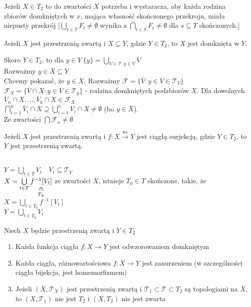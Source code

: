 \begin{uw} 
    Jeżeli $X \in T_2$ to do zwartości $X$ potrzeba i wystaracza, aby każda rodzina
    zbiorów domkniętych w $x$, mająca własność skończonego przekroju, miała niepusty 
    przekrój $[ \bigcup\limits_{t \in T} F_t \neq \emptyset$ wynika z $\bigcap\limits_{t
    \in S} F_t \neq \emptyset$ dla $ s \subseteq T$ skończonych.]
\end{uw} 
\begin{tw} 
    Jeżeli $X$ jest przestrzenią zwartą i $X \subseteq Y$, gdzie $Y \in T_2$, to 
    $X$ jest domknięta w $Y$.
\end{tw} 
\begin{dd} 
    Skoro $Y \in T_2$, to dla $y \in Y \ \{y\} = \bigcup\limits_{V \in \mathcal T,y \in V} \overline V$ \\ 
    Rozważmy $y \in \overline X \subseteq Y$ \\ 
    Chcemy pokazać, że $y \in X$. Rozważmy $\mathcal F = \{ \overline V: y \in V \in \mathcal T_Y\}$ \\ 
    $\mathcal F_X = \{ \overline V \cap X : y \in V \in \mathcal T_y\}$ - rodzina domkniętych podzbiorów $X$.
    Dla dowolnych $\overline V_n \cap X, \ldots, \overline V_k \cap X \in \mathcal F_X$ \\ 
    $\bigcap\limits_{i=1}^n \overline V_i \cap X \supseteq \overline{ \bigcup\limits_{i=1}^n V_i} \cap X \neq \emptyset$
    (bo $y \in \overline X$).\\ Ze zwartości $\bigcap \mathcal F_x \neq \emptyset$ 
\end{dd} 
\begin{tw} Jeżeli $X$ jest przestrzenią zwartą i $f: X \xrightarrow{\text{na}} Y$ jest ciągłą surjekcją, gdzie $Y \in T_2$, to $Y$ 
jest przestrzenią zwartą. \end{tw} 
\begin{dd} ~\\ 
    $Y = \bigcup\limits_{t \in T} V_t \quad V_t \subseteq \mathcal T_Y$ \\ 
    $X = \bigcup\limits_{t \in T} \underscript{f^{-1}[V_t]}{\vertin}{\mathcal T_X}$ ze zwartości $X$, istnieje 
    $T_0 \in T$ skończone, takie, że $X = \bigcup\limits_{t \in T_0} f^{-1} [V_t]$ \\ 
    $Y = \bigcup\limits_{t \in T_0} V_t$
\end{dd} 
\begin{wn} 
    Niech $X$ będzie przestrzenią zwartą i $Y \in T_2$
    \begin{enumerate}[(1)] 
        \item Każda funkcja ciągła $f: X \to Y$ jest odwzorowaniem domkniętym 
        \item Każda ciągła, różnowartościowa $f: X \to Y$ jest zanurzeniem (w szczególności ciągła bijekcja, jest homemorfizmem)
        \item Jeżeli $(X,\mathcal T_X)$ jest przestrzenią zwartą i $\mathcal T_1 \subset \mathcal T \subset T_2$ są topologiami na $X$, to 
            $(X,\mathcal T_1)$ nie jest $T_2$ i $(X,T_2)$ nie jest zwarta 
    \end{enumerate} 
\end{wn} 
